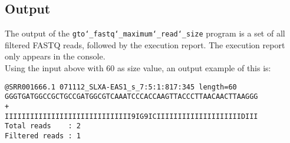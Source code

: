 \subsection*{Output}
The output of the \texttt{gto\char`_fastq\char`_maximum\char`_read\char`_size} program is a set of all filtered FASTQ reads, followed by the execution report.
The execution report only appears in the console.\\
Using the input above with 60 as size value, an output example of this is:
\begin{lstlisting}
@SRR001666.1 071112_SLXA-EAS1_s_7:5:1:817:345 length=60
GGGTGATGGCCGCTGCCGATGGCGTCAAATCCCACCAAGTTACCCTTAACAACTTAAGGG
+
IIIIIIIIIIIIIIIIIIIIIIIIIIIIII9IG9ICIIIIIIIIIIIIIIIIIIIIDIII
Total reads    : 2
Filtered reads : 1
\end{lstlisting}
